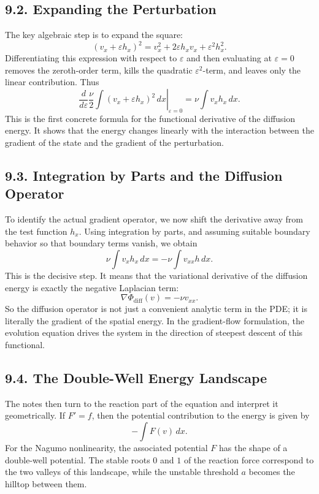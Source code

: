 \documentclass[11pt]{article}
\theoremstyle{definition}
\theoremstyle{remark}
\begin{document}
\subsection*{9.2. Expanding the Perturbation}
The key algebraic step is to expand the square:
\[
(v_x+\varepsilon h_x)^2
=v_x^2+2\varepsilon h_xv_x+\varepsilon^2 h_x^2.
\]
Differentiating this expression with respect to \(\varepsilon\) and then evaluating at \(\varepsilon=0\) removes the zeroth-order term, kills the quadratic \(\varepsilon^2\)-term, and leaves only the linear contribution. Thus
\[
\left.\frac{d}{d\varepsilon}\frac{\nu}{2}\int (v_x+\varepsilon h_x)^2\,dx\right|_{\varepsilon=0}
=\nu\int v_xh_x\,dx.
\]
This is the first concrete formula for the functional derivative of the diffusion energy. It shows that the energy changes linearly with the interaction between the gradient of the state and the gradient of the perturbation.

\subsection*{9.3. Integration by Parts and the Diffusion Operator}
To identify the actual gradient operator, we now shift the derivative away from the test function \(h_x\). Using integration by parts, and assuming suitable boundary behavior so that boundary terms vanish, we obtain
\[
\nu\int v_xh_x\,dx
=-\nu\int v_{xx}h\,dx.
\]
This is the decisive step. It means that the variational derivative of the diffusion energy is exactly the negative Laplacian term:
\[
\nabla\Phi_{\mathrm{diff}}(v)=-\nu v_{xx}.
\]
So the diffusion operator is not just a convenient analytic term in the PDE; it is literally the gradient of the spatial energy. In the gradient-flow formulation, the evolution equation drives the system in the direction of steepest descent of this functional.

\subsection*{9.4. The Double-Well Energy Landscape}
The notes then turn to the reaction part of the equation and interpret it geometrically. If \(F'=f\), then the potential contribution to the energy is given by
\[
-\int F(v)\,dx.
\]
For the Nagumo nonlinearity, the associated potential \(F\) has the shape of a double-well potential. The stable roots \(0\) and \(1\) of the reaction force correspond to the two valleys of this landscape, while the unstable threshold \(a\) becomes the hilltop between them.
\end{document}
